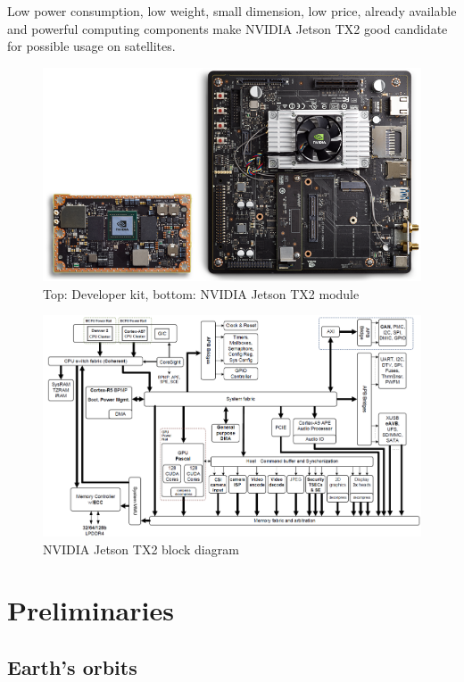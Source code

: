 \documentclass[12pt,a4paper,oneside]{article}
\begin{document}
Low power consumption, low weight, small dimension, low price, already available and powerful computing components make NVIDIA Jetson TX2 good candidate for possible usage on satellites.

\begin{figure}[!htbp]
\includegraphics[angle=90, scale=0.7]{NVIDIA_Jetson_TX2_Module_Devkit.png}
\centering
\caption{Top: Developer kit, bottom: NVIDIA Jetson TX2 module\cite{nvidia-jetsontx2}}
\label{fig:jetson-image}
\end{figure}

\begin{figure}[!htbp]
\includegraphics[angle=90, scale=0.5]{Tegra_Parker_Block_Diagram-1.png}
\centering
\caption{NVIDIA Jetson TX2 block diagram \cite{nvidia-jetsontx2}}
\label{fig:jetson-diagram-image}
\end{figure}


\clearpage
\section{Preliminaries}
\subsection{Earth's orbits}
\end{document}
